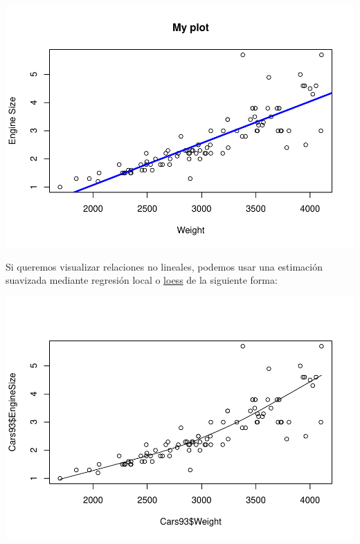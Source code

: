 \documentclass[
]{book}
\newenvironment{Shaded}{\begin{snugshade}}{\end{snugshade}}
\newcommand{\FunctionTok}[1]{\textcolor[rgb]{0.00,0.00,0.00}{#1}}
\newcommand{\NormalTok}[1]{#1}
\newcommand{\SpecialCharTok}[1]{\textcolor[rgb]{0.00,0.00,0.00}{#1}}
\begin{document}
\includegraphics{fig/unnamed-chunk-95-1.pdf}

Si queremos visualizar relaciones no lineales, podemos usar una estimación suavizada mediante regresión local o \href{https://es.wikipedia.org/wiki/Regresi\%C3\%B3n_local}{loess} de la siguiente forma:

\begin{Shaded}
\end{Shaded}

\includegraphics{fig/unnamed-chunk-96-1.pdf}
\end{document}
